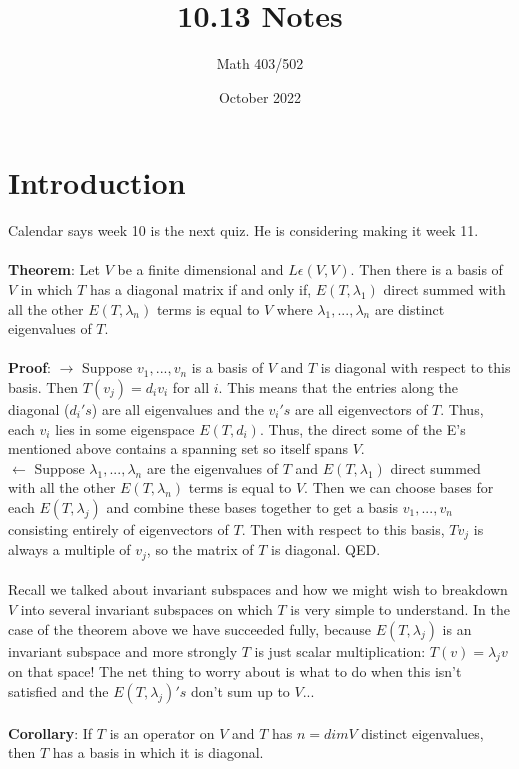 \documentclass{article}
\title{10.13 Notes}
\author{Math 403/502}
\date{October 2022}
\begin{document}
\maketitle

\section{Introduction}
Calendar says week 10 is the next quiz. He is considering making it week 11. \\\\
\textbf{Theorem}: Let $V$ be a finite dimensional and $L \epsilon (V,V)$. Then there is a basis of $V$ in which $T$ has a diagonal matrix if and only if, $E(T, \lambda_1)$ direct summed with all the other $E(T, \lambda_n)$ terms is equal to $V$ where $\lambda_1,..., \lambda_n$ are distinct eigenvalues of $T$. \\\\
\textbf{Proof}: $\rightarrow$ Suppose $v_1,..., v_n$ is a basis of $V$ and $T$ is diagonal with respect to this basis. Then $T(v_j) = d_iv_i$ for all $i$. This means that the entries along the diagonal ($d_i's$) are all eigenvalues and the $v_i's$ are all eigenvectors of $T$. Thus, each $v_i$ lies in some eigenspace $E(T, d_i)$. Thus, the direct some of the E's mentioned above contains a spanning set so itself spans $V$. \\
$\leftarrow$ Suppose $\lambda_1, ..., \lambda_n$ are the eigenvalues of $T$ and $E(T, \lambda_1)$ direct summed with all the other $E(T, \lambda_n)$ terms is equal to $V$. Then we can choose bases for each $E(T, \lambda_j)$ and combine these bases together to get a basis $v_1,...,v_n$ consisting entirely of eigenvectors of $T$. Then with respect to this basis, $Tv_j$ is always a multiple of $v_j$, so the matrix of $T$ is diagonal. QED. \\\\
Recall we talked about invariant subspaces and how we might wish to breakdown $V$ into several invariant subspaces on which $T$ is very simple to understand. In the case of the theorem above we have succeeded fully, because $E(T, \lambda_j)$ is an invariant subspace and more strongly $T$ is just scalar multiplication: $T(v) = \lambda_jv$ on that space! The net thing to worry about is what to do when this isn't satisfied and the $E(T, \lambda_j)'s$ don't sum up to $V$...\\\\
\textbf{Corollary}: If $T$ is an operator on $V$ and $T$ has $n = dim V$ distinct eigenvalues, then $T$ has a basis in which it is diagonal. \\
\end{document}
